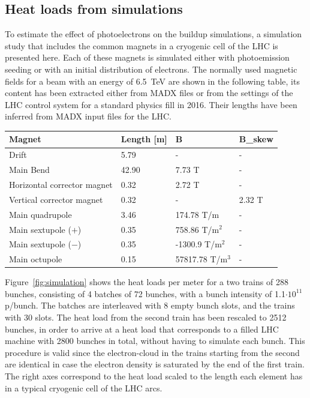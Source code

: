 \subsection{Heat loads from simulations}
To estimate the effect of photoelectrons on the buildup simulations, a simulation study that includes the common magnets in a cryogenic cell of the LHC is presented here.
Each of these magnets is simulated either with photoemission seeding or with an initial distribution of electrons.
The normally used magnetic fields for a beam with an energy of 6.5~TeV are shown in the following table, its content has been extracted either from MADX files or from the settings of the LHC control system for a standard physics fill in 2016.
Their lengths have been inferred from MADX input files for the LHC.
\begin{center}
    \begin{tabular}{llll}
        \textbf{Magnet} & \textbf{Length} [m]&\textbf{B} & \textbf{B\_skew}\\ \hline
        Drift & 5.79 & - & - \\
        Main Bend & 42.90 & 7.73 T& - \\
        Horizontal corrector magnet & 0.32 & 2.72 T & - \\
        Vertical corrector magnet & 0.32 & - & 2.32 T \\
        Main quadrupole & 3.46 & 174.78 T/m& - \\
        Main sextupole ($+$)& 0.35 & 758.86 T/m$^2$ & - \\
        Main sextupole ($-$) & 0.35 & -1300.9 T/m$^2$ & - \\
        Main octupole & 0.15 & 57817.78 T/m$^3$ & - \\
    \end{tabular}
\end{center}

Figure~\ref{fig:simulation} shows the heat loads per meter for a two trains of 288 bunches, consisting of 4 batches of 72 bunches, with a bunch intensity of 1.1$\cdot10^{11}$ p/bunch.
The batches are interleaved with 8 empty bunch slots, and the trains with 30 slots.
The heat load from the second train has been rescaled to 2512 bunches, in order to arrive at a heat load that corresponds to a filled LHC machine with 2800 bunches in total, without having to simulate each bunch.
This procedure is valid since the electron-cloud in the trains starting from the second are identical in case the electron density is saturated by the end of the first train.
The right axes correspond to the heat load scaled to the length each element has in a typical cryogenic cell of the LHC arcs.

